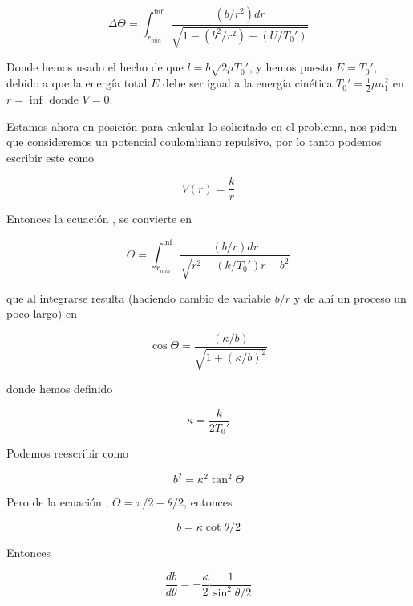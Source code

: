 \documentclass[a4paper,10pt]{article}
\numberwithin{equation}{section}
\begin{document}
\begin{equation}
 \Delta \Theta = \int_{r_{min}}^{\inf} \frac{(b/r^2)dr}{\sqrt{1 -
 (b^2/r^2) - (U/T_0')}}
 \label{eq:disper9}
\end{equation}

Donde hemos usado el hecho de que $l=b\sqrt{2\mu T_0'}$, y hemos puesto 
$E = T_0'$, debido a que la energía total $E$ debe ser igual a la energía
cinética $T_0'=\frac{1}{2} \mu u_1^2$ en $r=\inf$ donde $V=0$.

\vspace{.3cm}

Estamos ahora en posición para calcular lo solicitado en el problema, nos piden
que consideremos un potencial coulombiano repulsivo, por lo tanto podemos 
escribir este como

\begin{equation}
 V(r) = \frac{k}{r}
 \label{eq:coulombPot}
\end{equation}

Entonces la ecuación , se convierte en

\begin{equation}
 \Theta = \int_{r_{min}}^{\inf} \frac{(b/r)dr}{\sqrt{r^2-(k/T_0')r-b^2}}
\end{equation}

que al integrarse resulta (haciendo cambio de variable $b/r$ y de ahí un
proceso un poco largo) en

\begin{equation}
 \cos{\Theta} = \frac{(\kappa/b)}{\sqrt{1+(\kappa/b)^2}}
 \label{eq:CosThet}
\end{equation}

donde hemos definido

\begin{equation}
 \kappa = \frac{k}{2T_0'}
\end{equation}

Podemos reescribir  como

\begin{equation}
 b^2=\kappa^2 \tan^2{\Theta}
\end{equation}

Pero de la ecuación , $\Theta = \pi /2 - \theta/2$,
entonces

\begin{equation}
 b = \kappa \cot{\theta/2}
\end{equation}

Entonces

\begin{equation}
\frac{db}{d\theta} = - \frac{\kappa}{2} \frac{1}{\sin^2{\theta/2}} 
\end{equation}
\end{document}
